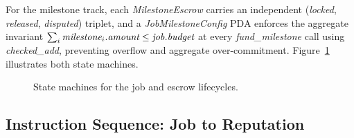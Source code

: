 For the milestone track, each \emph{MilestoneEscrow} carries an independent (\emph{locked}, \emph{released}, \emph{disputed}) triplet, and a \emph{JobMilestoneConfig} PDA enforces the aggregate invariant $\sum_i \emph{milestone}_i.\emph{amount} \leq \emph{job.budget}$ at every \emph{fund\_milestone} call using \emph{checked\_add}, preventing overflow and aggregate over-commitment. Figure~\ref{fig:state_machines} illustrates both state machines.

%
%
\begin{figure}[H]
    \centering
    \caption{State machines for the job and escrow lifecycles.}
    \label{fig:state_machines}
\end{figure}

\subsection{Instruction Sequence: Job to Reputation}


